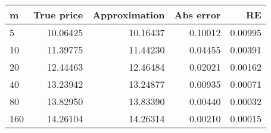 \begin{tabular}{lrrrr}
\toprule
m &  True price &  Approximation &  Abs error &       RE \\
\midrule
5   &    10.06425 &       10.16437 &    0.10012 &  0.00995 \\
10  &    11.39775 &       11.44230 &    0.04455 &  0.00391 \\
20  &    12.44463 &       12.46484 &    0.02021 &  0.00162 \\
40  &    13.23942 &       13.24877 &    0.00935 &  0.00071 \\
80  &    13.82950 &       13.83390 &    0.00440 &  0.00032 \\
160 &    14.26104 &       14.26314 &    0.00210 &  0.00015 \\
\bottomrule
\end{tabular}
